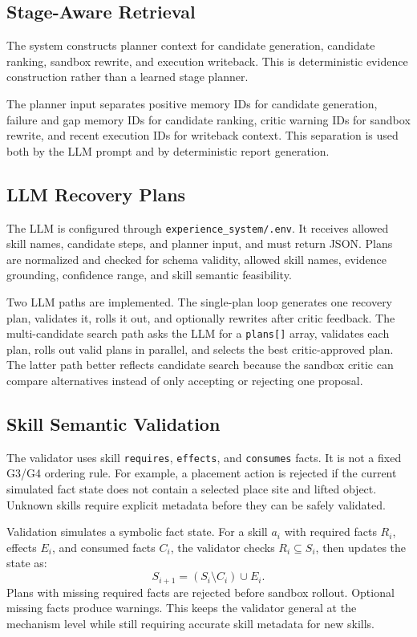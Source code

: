 \documentclass[conference]{IEEEtran}
\begin{document}
\subsection{Stage-Aware Retrieval}
The system constructs planner context for candidate generation, candidate ranking, sandbox rewrite, and execution writeback. This is deterministic evidence construction rather than a learned stage planner.

The planner input separates positive memory IDs for candidate generation, failure and gap memory IDs for candidate ranking, critic warning IDs for sandbox rewrite, and recent execution IDs for writeback context. This separation is used both by the LLM prompt and by deterministic report generation.

\subsection{LLM Recovery Plans}
The LLM is configured through \texttt{experience\_system/.env}. It receives allowed skill names, candidate steps, and planner input, and must return JSON. Plans are normalized and checked for schema validity, allowed skill names, evidence grounding, confidence range, and skill semantic feasibility.

Two LLM paths are implemented. The single-plan loop generates one recovery plan, validates it, rolls it out, and optionally rewrites after critic feedback. The multi-candidate search path asks the LLM for a \texttt{plans[]} array, validates each plan, rolls out valid plans in parallel, and selects the best critic-approved plan. The latter path better reflects candidate search because the sandbox critic can compare alternatives instead of only accepting or rejecting one proposal.

\subsection{Skill Semantic Validation}
The validator uses skill \texttt{requires}, \texttt{effects}, and \texttt{consumes} facts. It is not a fixed G3/G4 ordering rule. For example, a placement action is rejected if the current simulated fact state does not contain a selected place site and lifted object. Unknown skills require explicit metadata before they can be safely validated.

Validation simulates a symbolic fact state. For a skill $a_i$ with required facts $R_i$, effects $E_i$, and consumed facts $C_i$, the validator checks $R_i \subseteq S_i$, then updates the state as:
\begin{equation}
S_{i+1} = (S_i \setminus C_i) \cup E_i .
\end{equation}
Plans with missing required facts are rejected before sandbox rollout. Optional missing facts produce warnings. This keeps the validator general at the mechanism level while still requiring accurate skill metadata for new skills.
\end{document}
